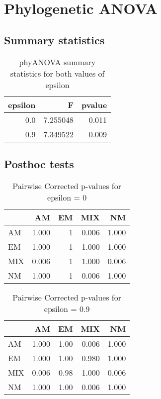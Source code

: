 \documentclass[]{article}
\begin{document}
\hypertarget{phylogenetic-anova}{%
\section{Phylogenetic ANOVA}\label{phylogenetic-anova}}

\hypertarget{summary-statistics}{%
\subsection{Summary statistics}\label{summary-statistics}}

\begin{table}[H]

\caption{\label{tab:unnamed-chunk-7}phyANOVA summary statistics for both values of epsilon}
\centering
\begin{tabular}{r|r|r}
\hline
epsilon & F & pvalue\\
\hline
0.0 & 7.255048 & 0.011\\
\hline
0.9 & 7.349522 & 0.009\\
\hline
\end{tabular}
\end{table}

\hypertarget{posthoc-tests}{%
\subsection{Posthoc tests}\label{posthoc-tests}}

\begin{table}[H]

\caption{\label{tab:unnamed-chunk-8}Pairwise Corrected p-values for epsilon = 0}
\centering
\begin{tabular}{l|r|r|r|r}
\hline
  & AM & EM & MIX & NM\\
\hline
AM & 1.000 & 1 & 0.006 & 1.000\\
\hline
EM & 1.000 & 1 & 1.000 & 1.000\\
\hline
MIX & 0.006 & 1 & 1.000 & 0.006\\
\hline
NM & 1.000 & 1 & 0.006 & 1.000\\
\hline
\end{tabular}
\end{table}

\begin{table}[H]

\caption{\label{tab:unnamed-chunk-9}Pairwise Corrected p-values for epsilon = 0.9}
\centering
\begin{tabular}{l|r|r|r|r}
\hline
  & AM & EM & MIX & NM\\
\hline
AM & 1.000 & 1.00 & 0.006 & 1.000\\
\hline
EM & 1.000 & 1.00 & 0.980 & 1.000\\
\hline
MIX & 0.006 & 0.98 & 1.000 & 0.006\\
\hline
NM & 1.000 & 1.00 & 0.006 & 1.000\\
\hline
\end{tabular}
\end{table}
\end{document}
